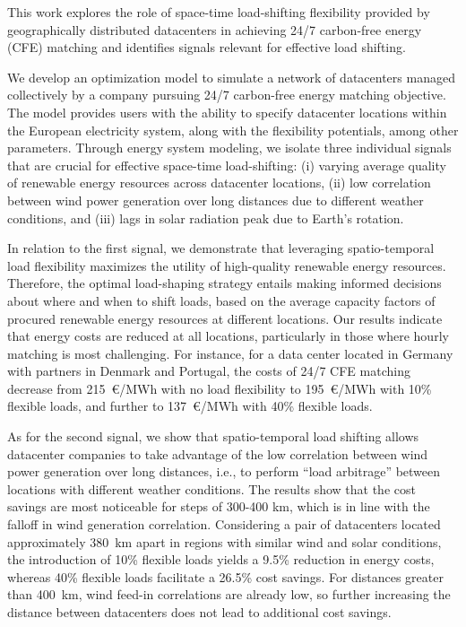 %

This work explores the role of space-time load-shifting flexibility provided by geographically distributed datacenters in achieving 24/7 carbon-free energy (CFE) matching and identifies signals relevant for effective load shifting.

We develop an optimization model to simulate a network of datacenters managed collectively by a company pursuing 24/7 carbon-free energy matching objective.
The model provides users with the ability to specify datacenter locations within the European electricity system, along with the flexibility potentials, among other parameters.
Through energy system modeling, we isolate three individual signals that are crucial for effective space-time load-shifting: (i) varying average quality of renewable energy resources across datacenter locations, (ii) low correlation between wind power generation over long distances due to different weather conditions, and (iii) lags in solar radiation peak due to Earth's rotation.

In relation to the first signal, we demonstrate that leveraging spatio-temporal load flexibility maximizes the utility of high-quality renewable energy resources. Therefore, the optimal load-shaping strategy entails making informed decisions about where and when to shift loads, based on the average capacity factors of procured renewable energy resources at different locations. Our results indicate that energy costs are reduced at all locations, particularly in those where hourly matching is most challenging. For instance, for a data center located in Germany with partners in Denmark and Portugal, the costs of 24/7 CFE matching decrease from 215~\euro/MWh with no load flexibility to 195~\euro/MWh with 10\% flexible loads, and further to 137~\euro/MWh with 40\% flexible loads.

As for the second signal, we show that spatio-temporal load shifting allows datacenter companies to take advantage of the low correlation between wind power generation over long distances, i.e., to perform \enquote{load arbitrage} between locations with different weather conditions.
The results show that the cost savings are most noticeable for steps of 300-400 km, which is in line with the falloff in wind generation correlation.
Considering a pair of datacenters located approximately 380~km apart in regions with similar wind and solar conditions, the introduction of 10\% flexible loads yields a 9.5\% reduction in energy costs, whereas 40\% flexible loads facilitate a 26.5\% cost savings.
For distances greater than 400~km, wind feed-in correlations are already low, so further increasing the distance between datacenters does not lead to additional cost savings.

